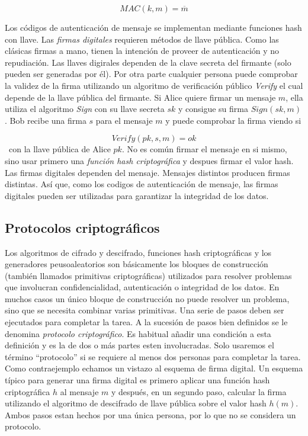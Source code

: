 \documentclass[12pt]{article}
\theoremstyle{definition}
\begin{document}
$$MAC(k,m)=\overline{m}$$

Los códigos de autenticación de mensaje se implementan mediante funciones hash con llave.
\newline
\newline
Las \textit{firmas digitales} requieren métodos de llave pública. Como las clásicas firmas a mano, tienen la intención de proveer de autenticación y no repudiación. Las llaves digirales dependen de la clave secreta del firmante (solo pueden ser generadas por él). Por otra parte cualquier persona puede comprobar la validez de la firma utilizando un algoritmo de verificación público \textit{Verify} el cual depende de la llave pública del firmante. Si Alice quiere firmar un mensaje $m$, ella utiliza el algoritmo \textit{Sign} con su llave secreta $sk$ y consigue su firma $Sign(sk,m)$. Bob recibe una firma $s$ para el mensaje $m$ y puede comprobar la firma viendo si

$$Verify(pk,s,m)=ok$$
\ 
con la llave pública de Alice $pk$.
\newline
No es común firmar el mensaje en si mismo, sino usar primero una \textit{función hash criptográfica} y despues firmar el valor hash. Las firmas digitales dependen del mensaje. Mensajes distintos producen firmas distintas. Así que, como los codigos de autenticación de mensaje, las firmas digitales pueden ser utilizadas para garantizar la integridad de los datos.


\subsection{Protocolos criptográficos}

Los algoritmos de cifrado y descifrado, funciones hash criptográficas y los generadores peusoaleatorios son básicamente los bloques de construcción (también llamados primitivas criptográficas) utilizados para resolver problemas que involucran confidencialidad, autenticación o integridad de los datos.
\newline
\newline
En muchos casos un único bloque de construcción no puede resolver un problema, sino que se necesita combinar varias primitivas. Una serie de pasos deben ser ejecutados para completar la tarea. A la sucesión de pasos bien definidos se le denomina \textit{protocolo criptográfico}. Es habitual añadir una condición a esta definición y es la de dos o más partes esten involucradas. Solo usaremos el término ``protocolo'' si se requiere al menos dos personas para completar la tarea.
\newline
\newline
Como contraejemplo echamos un vistazo al esquema de firma digital. Un esquema típico para generar una firma digital es primero aplicar una función hash criptográfica $h$ al mensaje $m$ y después, en un segundo paso, calcular la firma utilizando el algoritmo de descifrado de llave pública sobre el valor hash $h(m)$. Ambos pasos estan hechos por una única persona, por lo que no se considera un protocolo.
\end{document}

